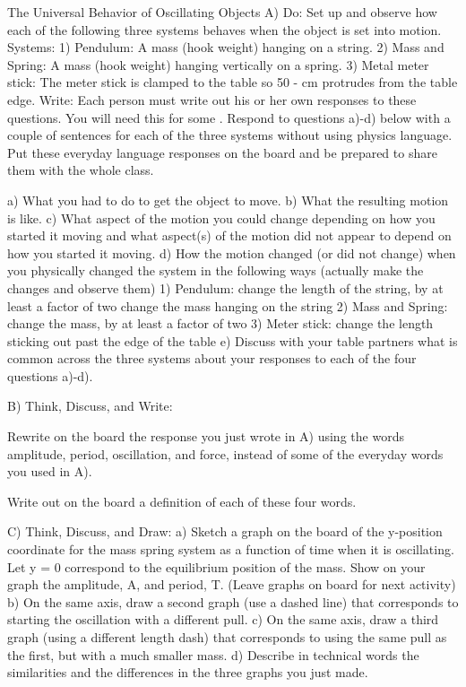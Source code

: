 The Universal Behavior of Oscillating Objects
A) Do:
Set up and observe how each of the following three systems behaves when the object is set into motion.
Systems:	1)	Pendulum:  A mass (hook weight) hanging on a string.
2)	Mass and Spring:  A mass (hook weight) hanging vertically on a spring.
3)	Metal meter stick: The meter stick is clamped to the table so 50 - \unit[90]{cm} protrudes from the table edge.
   Write: Each person must write out his or her own responses to these questions. You will need this for some \FNTs.  Respond to questions a)-d) below with a couple of sentences for each of the three systems without using physics language. Put these everyday language responses on the board and be prepared to share them with the whole class.

a)	What you had to do to get the object to move.
b)	What the resulting motion is like.
c)	What aspect of the motion you could change depending on how you started it moving and what aspect(s) of the motion did not appear to depend on how you started it moving.
d)	How the motion changed (or did not change) when you physically changed the system in the following ways (actually make the changes and observe them)
1)	Pendulum:		change the length of the string, by at least a factor of two
				change  the mass hanging on the string
2)	Mass and Spring:	change the mass, by at least a factor of two
3)	Meter stick:	change the length sticking out past the edge of the table
 e)	Discuss with your table partners what is common across the three systems about your responses to each of the four questions a)-d).
 
\WCD

 B) Think, Discuss, and Write:
	\item Rewrite on the board the response you just wrote in A) using the words amplitude, period, oscillation, and force, instead of some of the everyday words you used in A).  
	\item Write out on the board a definition of each of these four words.

\WCD

 C) Think, Discuss, and Draw:
a)	Sketch a graph on the board of the y-position coordinate for the mass spring system as a function of time when it is oscillating.  Let y = 0 correspond to the equilibrium position of the mass.  Show on your graph the amplitude, A, and period, T.  (Leave graphs on board for next activity)
b)	On the same axis, draw a second graph (use a dashed line) that corresponds to starting the oscillation with a different pull.
c)	On the same axis, draw a third graph (using a different length dash) that corresponds to using the same pull as the first, but with a much smaller mass.
d)	Describe in technical words the similarities and the differences in the three graphs you just made.

\WCD
